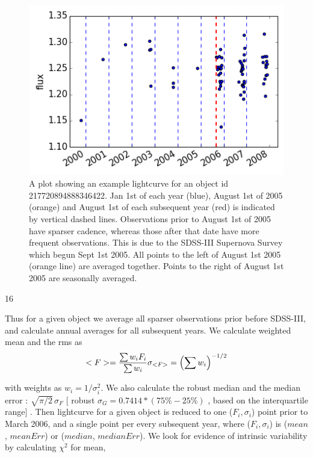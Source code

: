 \documentclass[fleqn,usenatbib]{mnras}  %
\begin{document}
\begin{figure}
\label{fig:lc_example}
 \includegraphics[width=\columnwidth]{Lightcurve_full_obj_217720894888346422.png}
 \cprotect\caption{A plot showing an example lightcurve for an object id 217720894888346422. Jan 1st of each year (blue),  August 1st of 2005 (orange) and August 1st of each subsequent year (red) is indicated by vertical dashed lines. Observations prior to August 1st of 2005 have sparser cadence, whereas those after that date have more frequent observations.  This is due to the SDSS-III Supernova Survey which begun  Sept 1st 2005.  All points to the left of August 1st 2005 (orange line) are averaged together.  Points to the right of August 1st 2005 are seasonally averaged. }
\end{figure}

16

Thus for a given object we average all sparser observations prior before SDSS-III, and calculate annual averages for all subsequent years. We calculate weighted mean and the rms as 
\begin{equation}
<F> = \frac{\sum {w_{i}F_{i}}}{\sum{w_{i}}} \\
\sigma_{<F>} = \left( \sum{w_{i}}\right) ^{-1/2} 
\end{equation}

with weights as  $w_{i} = 1 / \sigma_{i}^{2}$. We also calculate the robust  median and the median error : $\sqrt{\pi / 2} \, \sigma_{F}$  [ robust $\sigma_{G} = 0.7414 * (75\% - 25\%) $ , based on the interquartile range] . Then lightcurve for a given object is reduced to one ($F_{i}, \sigma_{i}$) point prior to March 2006, and a single point per every subsequent year, where  ($F_{i}, \sigma_{i}$) is ($mean$, $meanErr$) or ($median$, $medianErr$). We look for evidence of intrinsic variability by calculating   $\chi^{2}$ for mean, 
\end{document}
